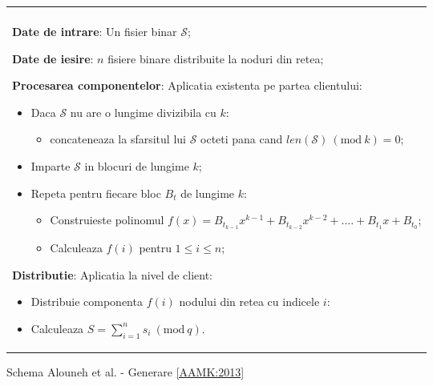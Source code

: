 \documentclass{llncs}
\newcommand{\Mod}[1]{\ (\text{mod}\ #1)}
\begin{document}
\begin{figure*}[h!]

\begin{tabular}{|p{\textwidth}|}
\hline

\\
\hspace{.1in}
\textbf{Date de intrare}: Un fisier binar $\mathcal{S}$;
\medskip

\hspace{.1in}
\textbf{Date de iesire}: $n$ fisiere binare distribuite la noduri din retea;
\medskip

\hspace{.1in}
\textbf{Procesarea componentelor}: Aplicatia existenta pe partea clientului: 
	\begin{itemize}
		\item Daca $\mathcal{S}$ nu are o lungime divizibila cu $k$:
			\begin{itemize}
			\item concateneaza la sfarsitul lui $\mathcal{S}$ octeti pana cand $len(\mathcal{S}) \Mod k = 0$;
			\end{itemize}
		\item Imparte $\mathcal{S}$ in blocuri de lungime $k$;
		\item Repeta pentru fiecare bloc $B_t$ de lungime $k$:
		\begin{itemize}
			\item Construieste polinomul $f(x) = B_{t_{k - 1}}x ^ {k-1} + B_{t_{k - 2}}x ^ {k - 2} + .... + B_{t_1}x + B_{t_0}$;
			\item Calculeaza $f(i)$ pentru $1 \leq i \leq n$;
		\end{itemize}
	\end{itemize}

\hspace{.1in}
\textbf{Distributie}: Aplicatia la nivel de client:
	\begin{itemize}
		\item Distribuie componenta $f(i)$ nodului din retea cu indicele $i$:
		\item Calculeaza $S = \sum\limits_{i=1}^{n} s_i \Mod q$.
	\end{itemize}

\\
\hline
\end{tabular}
\caption{Schema Alouneh et al. - Generare \ref{AAMK:2013}}
\label{fig:alouneh_distribution}
\end{figure*}
\end{document}
